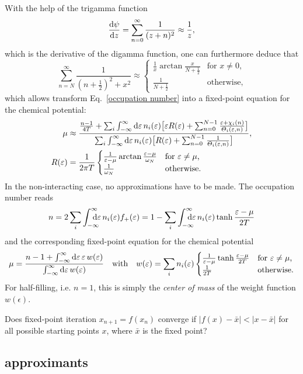 %
With the help of the trigamma function
%
\begin{align*}
   \frac{\mathrm d \psi}{\mathrm d z} = \sum_{n = 0}^\infty \frac 1 {(z + n)^2}
   \approx \frac 1 z,
\end{align*}
%
which is the derivative of the digamma function, one can furthermore deduce that
%
\begin{equation*}
   \sum_{n = N}^\infty \frac 1 {(n + \tfrac 1 2)^2 + x^2}
   \approx
   \begin{cases}
      \frac 1 x \arctan \frac x {N + \frac 1 2}
         & \text{for $x \neq 0$,} \\
      \frac 1 {N + \frac 1 2}
         & \text{otherwise,}
   \end{cases}
\end{equation*}
%
which allows transform Eq.~\ref{occupation number} into a fixed-point equation
for the chemical potential:
%
\begin{align*}
   \mu &\approx \frac
   {
      \frac{n - 1}{4 T}
      + \sum_i \int_{-\infty}^\infty \mathrm d \varepsilon \, n_i(\varepsilon)
      \big[
         \varepsilon R(\varepsilon) + \sum_{n = 0}^{N - 1}
         \frac{\varepsilon + \chi_i(n)}{\varTheta_i(\varepsilon, n)}
      \big]
   }
   {
      \sum_i \int_{-\infty}^\infty \mathrm d \varepsilon \, n_i(\varepsilon)
      \big[
         R(\varepsilon) + \sum_{n = 0}^{N - 1} \frac 1 {\varTheta_i(\varepsilon, n)}
      \big]
   },
   \\
   R(\varepsilon) &= \frac 1 {2 \pi T}
   \begin{cases}
      \frac 1 {\varepsilon - \mu} \arctan \frac{\varepsilon - \mu}{\omega_N}
         & \text{for $\varepsilon \neq \mu$,} \\
      \frac 1 {\omega_N}
         & \text{otherwise.}
   \end{cases}
\end{align*}
%
In the non-interacting case, no approximations have to be made. The occupation
number reads
%
\begin{equation*}
    n = 2 \sum_i \int \from{-\infty} \till \infty \D \epsilon \,
    n_i(\epsilon) f_+(\epsilon)
    = 1 - \sum_i \int \from{-\infty} \till \infty \D \epsilon \,
    n_i(\epsilon) \tanh \frac{\epsilon - \mu}{2 T}
\end{equation*}
%
and the corresponding fixed-point equation for the chemical potential
%
\begin{equation*}
    \mu = \frac
        {n - 1 + \int_{-\infty}^\infty \mathrm d \varepsilon \, \varepsilon \, w(\varepsilon)}
        {\int_{-\infty}^\infty \mathrm d \varepsilon \, w(\varepsilon)}
    \quad \text{with} \quad
    w(\varepsilon) = \sum_i n_i(\varepsilon)
    \begin{cases}
       \frac 1 {\varepsilon - \mu} \tanh \frac{\varepsilon - \mu}{2 T}
          & \text{for $\varepsilon \neq \mu$,} \\
       \frac 1 {2 T}
          & \text{otherwise.}
    \end{cases}
\end{equation*}
%
For half-filling, i.e. $n = 1$, this is simply the \emph{center of mass} of the
weight function $w(\epsilon)$.

Does fixed-point iteration $x_{n + 1} = f(x_n)$ converge if $|f(x) - \bar x| <
|x - \bar x|$ for all possible starting points $x$, where $\bar x$ is the fixed
point?

\subsection{ approximants}
